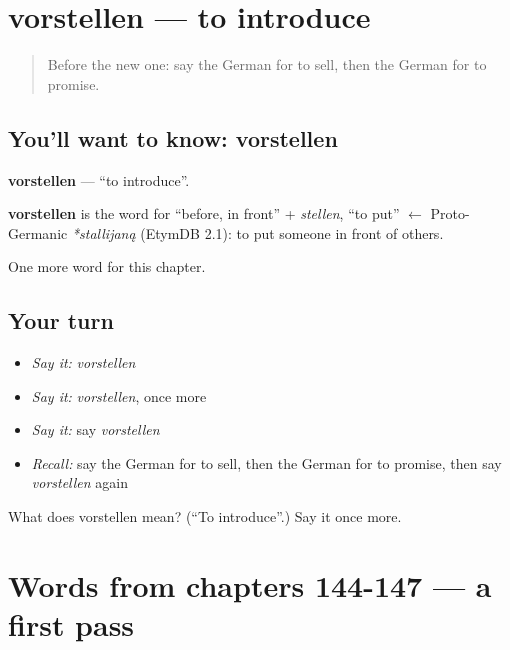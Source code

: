 \section[vorstellen]{vorstellen — to introduce}

\label{lesson:GE-C152-vorstellen}



\begin{quote}
Before the new one: say the German for to sell, then the German for to promise.
\end{quote}

\subsection*{You'll want to know: vorstellen}
\textbf{vorstellen} — \textquotedblleft{}to introduce\textquotedblright{}.

\begin{cousinweb}
\textbf{vorstellen} is the word for \textquotedblleft{}before, in front\textquotedblright{} + \emph{stellen}, \textquotedblleft{}to put\textquotedblright{} $\leftarrow$ Proto-Germanic \emph{*stallijaną} (EtymDB 2.1): to put someone in front of others.
\end{cousinweb}

\begin{grammarlens}[title={What you've built}]
One more word for this chapter.
\end{grammarlens}

\subsection*{Your turn}
\begin{itemize}
\raggedright
  \item \emph{Say it:} \emph{vorstellen}
  \item \emph{Say it:} \emph{vorstellen}, once more
  \item \emph{Say it:} say \emph{vorstellen}
  \item \emph{Recall:} say the German for to sell, then the German for to promise, then say \emph{vorstellen} again
\end{itemize}

\begin{tcolorbox}[breakable,colback=teal!4,colframe=teal!35!black,title={Before you move on}]
What does vorstellen mean? (\textquotedblleft{}To introduce\textquotedblright{}.) Say it once more.
\end{tcolorbox}
\section[(dialogue)]{Words from chapters 144-147 — a first pass}

